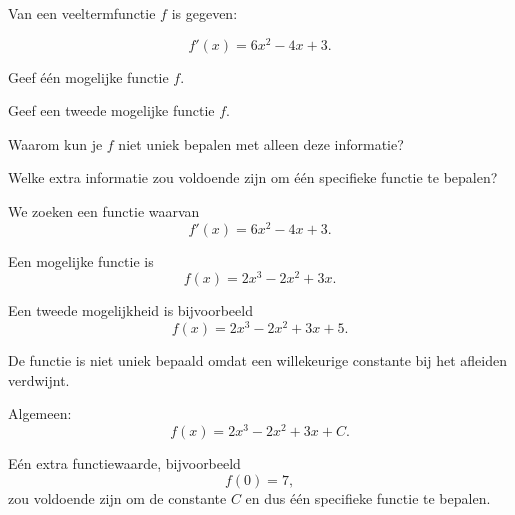 \documentclass{ximera}
\begin{document}
\begin{oefening}{\oefU\ESS}

Van een veeltermfunctie $f$ is gegeven:

\[
f'(x)=6x^2-4x+3.
\]

\begin{question}
Geef één mogelijke functie $f$.
\end{question}

\begin{question}
Geef een tweede mogelijke functie $f$.
\end{question}

\begin{question}
Waarom kun je $f$ niet uniek bepalen met alleen deze informatie?
\end{question}

\begin{question}
Welke extra informatie zou voldoende zijn om één specifieke functie
te bepalen?
\end{question}

\begin{oplossing}

We zoeken een functie waarvan
\[
f'(x)=6x^2-4x+3.
\]

Een mogelijke functie is
\[
\boxed{f(x)=2x^3-2x^2+3x}.
\]

Een tweede mogelijkheid is bijvoorbeeld
\[
\boxed{f(x)=2x^3-2x^2+3x+5}.
\]

De functie is niet uniek bepaald omdat een willekeurige constante bij het
afleiden verdwijnt.

Algemeen:
\[
f(x)=2x^3-2x^2+3x+C.
\]

Eén extra functiewaarde, bijvoorbeeld
\[
f(0)=7,
\]
zou voldoende zijn om de constante $C$ en dus één specifieke functie te
bepalen.

\end{oplossing}

\end{oefening}


\end{document}
